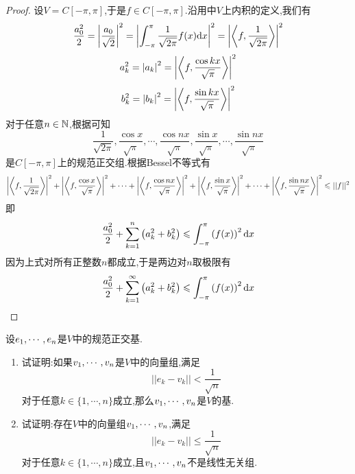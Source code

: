 \documentclass{ctexart}
\begin{document}
\begin{proof}
    设$V=C[-\pi,\pi]$,于是$f\in C[-\pi,\pi]$.沿用中$V$上内积的定义,我们有
    \[\dfrac{a_0^2}{2}=\left|\dfrac{a_0}{\sqrt{2}}\right|^2=\left|\int_{-\pi}^{\pi}\dfrac{1}{\sqrt{2\pi}}f(x)\mathrm{d} x\right|^2=\left|\left\langle{f},{\dfrac{1}{\sqrt{2\pi}}}\right\rangle\right|^2\]
    \[a_k^2=\left|a_k\right|^2=\left|\left\langle{f},{\dfrac{\cos kx}{\sqrt{\pi}}}\right\rangle\right|^2\]
    \[b_k^2=\left|b_k\right|^2=\left|\left\langle{f},{\dfrac{\sin kx}{\sqrt{\pi}}}\right\rangle\right|^2\]
    对于任意$n\in\mathbb{N}$,根据可知
    \[\dfrac{1}{\sqrt{2\pi}},\dfrac{\cos x}{\sqrt{\pi}},\cdots,\dfrac{\cos nx}{\sqrt{\pi}},\dfrac{\sin x}{\sqrt{\pi}},\cdots,\dfrac{\sin nx}{\sqrt{\pi}}\]
    是$C[-\pi,\pi]$上的规范正交组.根据Bessel不等式有
    \[\left|\left\langle{f},{\dfrac{1}{\sqrt{2\pi}}}\right\rangle\right|^2+\left|\left\langle{f},{\dfrac{\cos x}{\sqrt{\pi}}}\right\rangle\right|^2+\cdots+\left|\left\langle{f},{\dfrac{\cos nx}{\sqrt{\pi}}}\right\rangle\right|^2+\left|\left\langle{f},{\dfrac{\sin x}{\sqrt{\pi}}}\right\rangle\right|^2+\cdots+\left|\left\langle{f},{\dfrac{\sin nx}{\sqrt{\pi}}}\right\rangle\right|^2\leqslant||f||^2\]
    即
    \[\dfrac{a_0^2}{2}+\sum_{k=1}^{n}\left(a_k^2+b_k^2\right)\leqslant\int_{-\pi}^{\pi}\left(f(x)\right)^2\mathrm{d} x\]
    因为上式对所有正整数$n$都成立,于是两边对$n$取极限有
    \[\dfrac{a_0^2}{2}+\sum_{k=1}^{\infty}\left(a_k^2+b_k^2\right)\leqslant\int_{-\pi}^{\pi}\left(f(x)\right)^2\mathrm{d} x\]
\end{proof}
\begin{problem}[6.]
    设${e}_1,\cdots,{e}_{n}$是$V$中的规范正交基.
    \begin{enumerate}[label=\tbf{(\arabic*)}]
        \item 试证明:如果${v}_1,\cdots,{v}_{n}$是$V$中的向量组,满足
            \[||e_k-v_k||<\dfrac{1}{\sqrt{n}}\]
            对于任意$k\in\{1,\cdots,n\}$成立,那么${v}_1,\cdots,{v}_{n}$是$V$的基.
        \item 试证明:存在$V$中的向量组${v}_1,\cdots,{v}_{n}$,满足
            \[||e_k-v_k||\leqslant\dfrac{1}{\sqrt{n}}\]
            对于任意$k\in\{1,\cdots,n\}$成立,且${v}_1,\cdots,{v}_{n}$不是线性无关组.
    \end{enumerate}
\end{problem}
\end{document}
